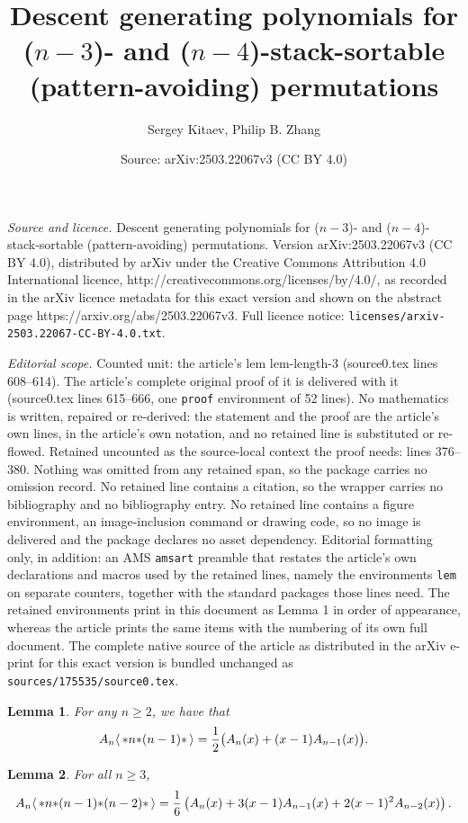 \documentclass[10pt,a4paper]{amsart}
\title{Descent generating polynomials for ($n-3$)- and ($n-4$)-stack-sortable (pattern-avoiding) permutations}
\author{Sergey Kitaev, Philip B. Zhang}
\date{Source: arXiv:2503.22067v3 (CC BY 4.0)}
\newtheorem{lem}{Lemma}
\newcommand{\glob}[1]{\ensuremath{\langle\, #1\,\rangle}}
\newcommand{\st}{\mbox{\ensuremath{\ast}}}
\begin{document}
\maketitle

\noindent\emph{Source and licence.} Descent generating polynomials for ($n-3$)- and ($n-4$)-stack-sortable (pattern-avoiding) permutations. Version arXiv:2503.22067v3 (CC BY 4.0), distributed by arXiv under the Creative Commons Attribution 4.0 International licence, http://creativecommons.org/licenses/by/4.0/, as recorded in the arXiv licence metadata for this exact version and shown on the abstract page https://arxiv.org/abs/2503.22067v3. Full licence notice: \texttt{licenses/arxiv-2503.22067-CC-BY-4.0.txt}.\par\smallskip

\noindent\textit{Editorial scope.} Counted unit: the article's lem lem-length-3 (source0.tex lines 608--614). The article's complete original proof of it is delivered with it (source0.tex lines 615--666, one \texttt{proof} environment of 52 lines). No mathematics is written, repaired or re-derived: the statement and the proof are the article's own lines, in the article's own notation, and no retained line is substituted or re-flowed.  Retained uncounted as the source-local context the proof needs: lines 376--380.  Nothing was omitted from any retained span, so the package carries no omission record.  No retained line contains a citation, so the wrapper carries no bibliography and no bibliography entry.  No retained line contains a figure environment, an image-inclusion command or drawing code, so no image is delivered and the package declares no asset dependency.  Editorial formatting only, in addition: an AMS \texttt{amsart} preamble that restates the article's own declarations and macros used by the retained lines, namely the environments \texttt{lem} on separate counters, together with the standard packages those lines need.  The retained environments print in this document as Lemma 1 in order of appearance, whereas the article prints the same items with the numbering of its own full document.  The complete native source of the article as distributed in the arXiv e-print for this exact version is bundled unchanged as \texttt{sources/175535/source0.tex}.
\begin{lem}\label{lem-1}
	For any $n\ge 2$, we have  that
	$$A_n \glob{\st n\st (n-1)\st }
		= \frac{1}{2}\big( A_{n}(x) + (x-1) A_{n-1}(x) \big).$$
\end{lem}

\begin{lem}\label{lem-length-3}
	For all $n\ge 3$,
	\begin{align*}
		A_n \glob{\st n\st (n-1)\st (n-2) \st }
		= \frac{1}{6} \left( A_{n}(x) + 3 (x-1) A_{n-1}(x) + 2(x-1)^2 A_{n-2}(x) \right).
	\end{align*}
\end{lem}
\end{document}
